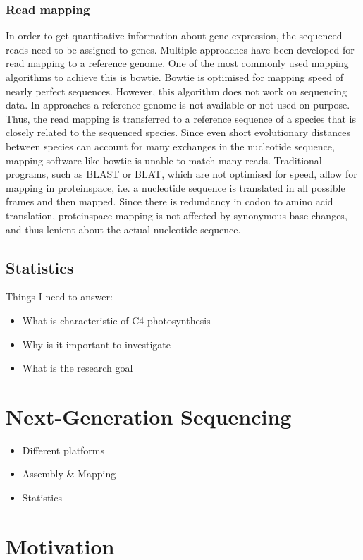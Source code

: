 \subsubsection{Read mapping}
In order to get quantitative information about gene expression, the sequenced reads need to be assigned to genes.
Multiple approaches have been developed for read mapping to a reference genome.
One of the most commonly used mapping algorithms to achieve this is bowtie.
Bowtie is optimised for mapping speed of nearly perfect sequences.
However, this algorithm does not work on  sequencing data.
In  approaches a reference genome is not available or not used on purpose.
Thus, the read mapping is transferred to a reference sequence of a species that is closely related to the sequenced species.
Since even short evolutionary distances between species can account for many exchanges in the nucleotide sequence, mapping software like bowtie is unable to match many reads.
Traditional programs, such as BLAST or BLAT, which are not optimised for speed, allow for mapping in proteinspace, i.e. a nucleotide sequence is translated in all possible frames and then mapped.
Since there is redundancy in codon to amino acid translation, proteinspace mapping is not affected by synonymous base changes, and thus lenient about the actual nucleotide sequence.

\subsection{Statistics}
Things I need to answer:
\begin{itemize}
	\item What is characteristic of C4-photosynthesis
	\item Why is it important to investigate
	\item What is the research goal
\end{itemize}
\section{Next-Generation Sequencing}
\begin{itemize}
	\item Different platforms
	\item Assembly \& Mapping
	\item Statistics
\end{itemize}
\section{Motivation}
